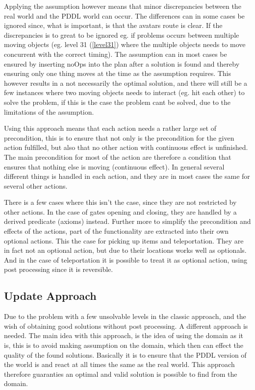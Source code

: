 		Applying the assumption however means that minor discrepancies between the real world and the PDDL world can occur. The differences can in some cases be ignored since, what is important, is that the avatars route is clear. If the discrepancies is to great to be ignored eg. if problems occurs between multiple moving objects (eg. level 31 (\ref{level31}) where the multiple objects needs to move concurrent with the correct timing). The assumption can in most cases be ensured by inserting noOps into the plan after a solution is found and thereby ensuring only one thing moves at the time as the assumption requires. This however results in a not necessarily the optimal solution, and there will still be a few instances where two moving objects needs to interact (eg. hit each other) to solve the problem, if this is the case the problem cant be solved, due to the limitations of the assumption.
			
		Using this approach means that each action needs a rather large set of precondition, this is to ensure that not only is the precondition for the given action fulfilled, but also that no other action with continuous effect is unfinished. The main precondition for most of the action are therefore a condition that ensures that nothing else is moving (continuous effect). In general several different things is handled in each action, and they are in most cases the same for several other actions. %
		
		There is a few cases where this isn't the case, since they are not restricted by other actions. In the case of gates opening and closing, they are handled by a derived predicate (axioms) instead. 
		Further more to simplify the precondition and effects of the actions, part of the functionality are extracted into their own optional actions. This the case for picking up items and teleportation. They are in fact not an optional action, but due to their locations works well as optionals. And in the case of teleportation it is possible to treat it as optional action, using post processing since it is reversible.
		
		\subsection{Update Approach}
		Due to the problem with a few unsolvable levels in the classic approach, and the wish of obtaining good solutions without post processing. A different approach is needed. The main idea with this approach, is the idea of using the domain as it is, this is to avoid making assumption on the domain, which then can effect the quality of the found solutions. Basically it is to ensure that the PDDL version of the world is and react at all times the same as the real world. This approach therefore guaranties an optimal and valid solution is possible to find from the domain.
		
